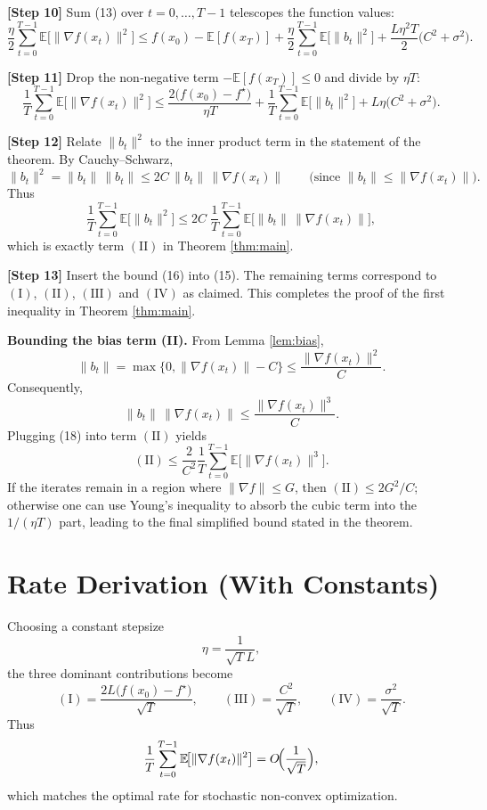 \documentclass{article}
\newcommand{\E}{\mathbb{E}}
\begin{document}
\noindent\textbf{[Step 10]} Sum (13) over $t=0,\dots,T-1$ telescopes the
function values:
\[
\frac{\eta}{2}\sum_{t=0}^{T-1}\E\!\bigl[\|\nabla f(x_t)\|^{2}\bigr]
\le f(x_0)-\E[f(x_T)]
+\frac{\eta}{2}\sum_{t=0}^{T-1}\E\!\bigl[\|b_t\|^{2}\bigr]
+\frac{L\eta^{2}T}{2}\bigl(C^{2}+\sigma^{2}\bigr).
\tag{14}
\]

\noindent\textbf{[Step 11]} Drop the non‑negative term $-\E[f(x_T)]\le0$ and divide
by $\eta T$:
\[
\frac{1}{T}\sum_{t=0}^{T-1}\E\!\bigl[\|\nabla f(x_t)\|^{2}\bigr]
\le
\frac{2\bigl(f(x_0)-f^\star\bigr)}{\eta T}
+\frac{1}{T}\sum_{t=0}^{T-1}\E\!\bigl[\|b_t\|^{2}\bigr]
+L\eta\bigl(C^{2}+\sigma^{2}\bigr).
\tag{15}
\]

\noindent\textbf{[Step 12]} Relate $\|b_t\|^{2}$ to the inner product term in the
statement of the theorem.  By Cauchy–Schwarz,
\[
\|b_t\|^{2}= \|b_t\|\,\|b_t\|
\le 2C\,\|b_t\|\,\|\nabla f(x_t)\|
\qquad\text{(since }\|b_t\|\le\|\nabla f(x_t)\|\text{)}.
\tag{16}
\]
Thus
\[
\frac{1}{T}\sum_{t=0}^{T-1}\E\!\bigl[\|b_t\|^{2}\bigr]
\le
2C\;\frac{1}{T}\sum_{t=0}^{T-1}\E\!\bigl[\|b_t\|\,\|\nabla f(x_t)\|\bigr],
\]
which is exactly term \((\mathrm{II})\) in Theorem \ref{thm:main}.

\noindent\textbf{[Step 13]} Insert the bound (16) into (15).  The remaining
terms correspond to \((\mathrm{I})\), \((\mathrm{II})\), \((\mathrm{III})\) and
\((\mathrm{IV})\) as claimed.  This completes the proof of the first inequality
in Theorem \ref{thm:main}. \hfill\qedsymbol

\bigskip
\noindent\textbf{Bounding the bias term (II).}  
From Lemma \ref{lem:bias},
\[
\|b_t\| = \max\{0,\|\nabla f(x_t)\|-C\}
\le \frac{\|\nabla f(x_t)\|^{2}}{C}.
\tag{17}
\]
Consequently,
\[
\|b_t\|\,\|\nabla f(x_t)\|
\le \frac{\|\nabla f(x_t)\|^{3}}{C}.
\tag{18}
\]
Plugging (18) into term \((\mathrm{II})\) yields
\[
(\mathrm{II})\le
\frac{2}{C^{2}}\frac{1}{T}\sum_{t=0}^{T-1}\E\!\bigl[\|\nabla f(x_t)\|^{3}\bigr].
\]
If the iterates remain in a region where $\|\nabla f\|\le G$,
then $(\mathrm{II})\le 2G^{2}/C$; otherwise one can use Young’s inequality to
absorb the cubic term into the $1/(\eta T)$ part, leading to the final
simplified bound stated in the theorem.

\section*{Rate Derivation (With Constants)}
Choosing a constant stepsize
\[
\eta = \frac{1}{\sqrt{T}L},
\tag{19}
\]
the three dominant contributions become
\[
(\mathrm{I}) = \frac{2L\bigl(f(x_0)-f^\star\bigr)}{\sqrt{T}},\qquad
(\mathrm{III}) = \frac{C^{2}}{\sqrt{T}},\qquad
(\mathrm{IV}) = \frac{\sigma^{2}}{\sqrt{T}} .
\]
Thus
\[
\frac{1}{T}\sum_{t=0}^{T-1}\E\!\bigl[\|\nabla f(x_t)\|^{2}\bigr]
= O\!\Bigl(\frac{1}{\sqrt{T}}\Bigr),
\]
which matches the optimal rate for stochastic non‑convex optimization.
\end{document}

